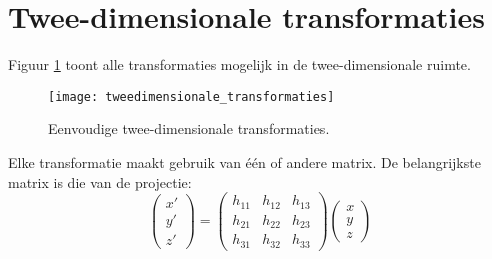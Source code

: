 \section{Twee-dimensionale transformaties}
Figuur \ref{fig:tweedimensionale_transformaties} toont alle transformaties mogelijk in de twee-dimensionale ruimte. 
\begin{figure}[h]
	\texttt{[image: tweedimensionale\_transformaties]}
	\caption{Eenvoudige twee-dimensionale transformaties.}
	\label{fig:tweedimensionale_transformaties}
\end{figure}
Elke transformatie maakt gebruik van één of andere matrix. De belangrijkste matrix is die van de projectie:
$$\begin{pmatrix}
x' \\ y' \\ z'
\end{pmatrix}
=
\begin{pmatrix}
h_{11} & h_{12} & h_{13} \\
h_{21} & h_{22} & h_{23} \\
h_{31} & h_{32} & h_{33}
\end{pmatrix}
\begin{pmatrix}
x \\ y \\ z
\end{pmatrix}$$

